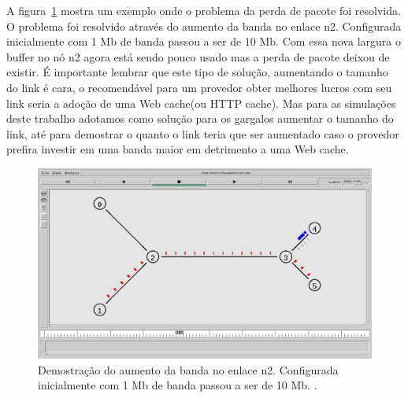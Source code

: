 \documentclass[12pt]{article}
\begin{document}
A figura~\ref{fig:aumentar} mostra um exemplo onde o problema da perda de pacote foi resolvida. O problema foi resolvido através do aumento da banda no enlace n2. Configurada inicialmente com 1 Mb de banda passou a ser de 10 Mb. Com essa nova largura o buffer no nó n2 agora está sendo pouco usado mas a perda de pacote deixou de existir. É importante lembrar que este tipo de solução, aumentando o tamanho do link é cara, o recomendável para um provedor obter melhores lucros com seu link seria a adoção de uma Web cache(ou HTTP cache). Mas para as simulações deste trabalho adotamos como solução para os gargalos aumentar o tamanho do link, até para demostrar o quanto o link teria que ser aumentado caso o provedor prefira investir em uma banda maior em detrimento a uma Web cache.

\begin{figure}[ht]
\centering
\includegraphics[width=.9\textwidth]{aumentar.jpg}
\caption { Demostração do aumento da banda no enlace n2. Configurada inicialmente com 1 Mb de banda passou a ser de 10 Mb. .}
\label{fig:aumentar}
\end{figure}
\end{document}
